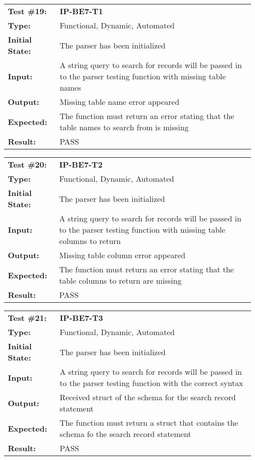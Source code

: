 \documentclass[12pt, titlepage]{article}
\begin{document}
\begin{mdframed}[linewidth=1pt]
\begin{tabularx}{\textwidth}{@{}p{3cm}X@{}}
{\bf Test \#19:} & {\bf IP-BE7-T1}\\[\baselineskip]
{\bf Type:} & Functional, Dynamic, Automated \\[0.5\baselineskip]
{\bf Initial State:} & The parser has been initialized \\[\baselineskip]
{\bf Input:} & A string query to search for records will be passed in to the parser testing function with missing table names \\[\baselineskip]
{\bf Output:} & Missing table name error appeared \\[\baselineskip]
{\bf Expected:} & The function must return an error stating that the table names to search from is missing \\[\baselineskip]
{\bf Result:} & PASS
\end{tabularx}
\end{mdframed}

\begin{mdframed}[linewidth=1pt]
\begin{tabularx}{\textwidth}{@{}p{3cm}X@{}}
{\bf Test \#20:} & {\bf IP-BE7-T2}\\[\baselineskip]
{\bf Type:} & Functional, Dynamic, Automated \\[0.5\baselineskip]
{\bf Initial State:} & The parser has been initialized \\[\baselineskip]
{\bf Input:} & A string query to search for records will be passed in to the parser testing function with missing table columns to return \\[\baselineskip]
{\bf Output:} & Missing table column error appeared \\[\baselineskip]
{\bf Expected:} & The function must return an error stating that the table columns to return are missing \\[\baselineskip]
{\bf Result:} & PASS
\end{tabularx}
\end{mdframed}

\begin{mdframed}[linewidth=1pt]
\begin{tabularx}{\textwidth}{@{}p{3cm}X@{}}
{\bf Test \#21:} & {\bf IP-BE7-T3}\\[\baselineskip]
{\bf Type:} & Functional, Dynamic, Automated \\[0.5\baselineskip]
{\bf Initial State:} & The parser has been initialized \\[\baselineskip]
{\bf Input:} & A string query to search for records will be passed in to the parser testing function with the correct syntax \\[\baselineskip]
{\bf Output:} & Received struct of the schema for the search record statement \\[\baselineskip]
{\bf Expected:} & The function must return a struct that contains the schema fo the search record statement \\[\baselineskip]
{\bf Result:} & PASS
\end{tabularx}
\end{mdframed}
\end{document}
